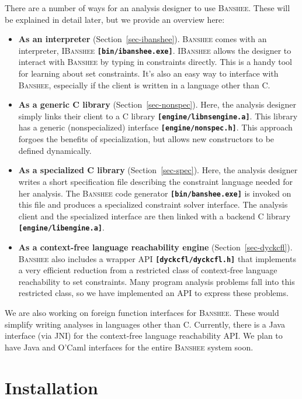 \documentclass[10pt]{article}
\newcommand{\banshee}{\textsc{Banshee}}
\newcommand{\ibanshee}{\textsc{IBanshee}}
\newcommand{\file}[1]{\texttt{\textbf{[#1]}}}
\begin{document}
There are a number of ways for an analysis designer to use
\banshee{}. These will be explained in detail later, but we provide an
overview here:
\begin{itemize}
\item \textbf{As an interpreter}
  (Section~\ref{sec-ibanshee}). \banshee{} comes with an interpreter,
  \ibanshee{} \file{bin/ibanshee.exe}. \ibanshee{} allows the designer
  to interact with \banshee{} by typing in constraints directly. This
  is a handy tool for learning about set constraints. It's also an
  easy way to interface with \banshee{}, especially if the client is
  written in a language other than C.
\item \textbf{As a generic C library}
  (Section~\ref{sec-nonspec}). Here, the analysis designer simply
  links their client to a C library \file{engine/libnsengine.a}. This
  library has a generic (nonspecialized) interface
  \file{engine/nonspec.h}. This approach forgoes the benefits of
  specialization, but allows new constructors to be defined
  dynamically.
\item \textbf{As a specialized C library}
  (Section~\ref{sec-spec}). Here, the analysis designer writes a short
  specification file describing the constraint language needed for her
  analysis. The \banshee{} code generator \file{bin/banshee.exe} is
  invoked on this file and produces a specialized constraint solver
  interface. The analysis client and the specialized interface are
  then linked with a backend C library \file{engine/libengine.a}.
\item \textbf{As a context-free language reachability engine}
  (Section~\ref{sec-dyckcfl}).  \banshee{} also includes a wrapper API
  \file{dyckcfl/dyckcfl.h} that implements a very efficient reduction
  from a restricted class of context-free language reachability to set
  constraints. Many program analysis problems fall into this
  restricted class, so we have implemented an API to express these
  problems.
\end{itemize}

We are also working on foreign function interfaces for
\banshee{}. These would simplify writing analyses in languages other
than C. Currently, there is a Java interface (via JNI) for the
context-free language reachability API. We plan to have Java and
O'Caml interfaces for the entire \banshee{} system soon.

\section{Installation}
\label{sec-install}
\end{document}

